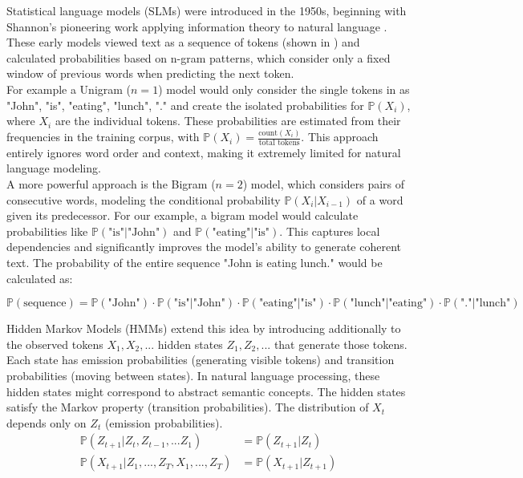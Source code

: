 \documentclass[%
thesis=student,%
coverpage=false,%
titlepage=false,%
headmarks=true, %
english,%
font=libertine, %
math=newpxtx, %
BCOR=5mm,%
coverBCOR=11mm%
]{tum-templates/book/tumbook}
\begin{document}
Statistical language models (SLMs) were introduced in the 1950s, beginning with Shannon's pioneering work applying information theory to natural language \cite{Shannon1951}. These early models viewed text as a sequence of tokens (shown in ) and calculated probabilities based on n-gram patterns, which consider only a fixed window of previous words when predicting the next token. \\

For example a Unigram ($n = 1$) model would only consider the single tokens in  as "John", "is", "eating", "lunch", "." and create the isolated probabilities for $\mathbb{P}(X_i)$, where $X_i$ are the individual tokens. These probabilities are estimated from their frequencies in the training corpus, with $\mathbb{P}(X_i) = \frac{\text{count}(X_i)}{\text{total tokens}}$. This approach entirely ignores word order and context, making it extremely limited for natural language modeling. \\

A more powerful approach is the Bigram ($n = 2$) model, which considers pairs of consecutive words, modeling the conditional probability $\mathbb{P}(X_i | X_{i-1})$ of a word given its predecessor. For our example, a bigram model would calculate probabilities like $\mathbb{P}(\text{"is"} | \text{"John"})$ and $\mathbb{P}(\text{"eating"} | \text{"is"})$. This captures local dependencies and significantly improves the model's ability to generate coherent text. The probability of the entire sequence "John is eating lunch." would be calculated as:

\begin{equation}
\mathbb{P}(\text{sequence}) = \mathbb{P}(\text{"John"}) \cdot \mathbb{P}(\text{"is"} | \text{"John"}) \cdot \mathbb{P}(\text{"eating"} | \text{"is"}) \cdot \mathbb{P}(\text{"lunch"} | \text{"eating"}) \cdot \mathbb{P}(\text{"."} | \text{"lunch"})
\end{equation}

Hidden Markov Models (HMMs) extend this idea by introducing additionally to the observed tokens $X_1, X_2,...$ hidden states $Z_1, Z_2, ...$ that generate those tokens. Each state has emission probabilities (generating visible tokens) and transition probabilities (moving between states). In natural language processing, these hidden states might correspond to abstract semantic concepts. 
The hidden states satisfy the Markov property (transition probabilities). The distribution of $X_t$ depends only on $Z_t$ (emission probabilities).
\begin{align}
\mathbb{P}(Z_{t+1}|Z_t,Z_{t-1},...Z_1) &= \mathbb{P}(Z_{t+1}|Z_t) \\
\mathbb{P}(X_{t+1}|Z_1,...,Z_T,X_1,...,Z_T) &= \mathbb{P}(X_{t+1}|Z_{t+1})
\end{align}
\end{document}
